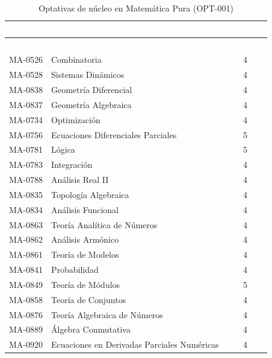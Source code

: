 \begingroup
\small
{}%
\renewcommand{\arraystretch}{1.2}%
%
\begin{longtable}{|l|>{\raggedright\arraybackslash}p{9.4cm}|c|}
\caption{Optativas de núcleo en Matemática Pura (OPT-001)}\label{res:opt001}\\
\hline
\rowcolor{Azul-UCR}
\textcolor{white}{\textbf{Sigla}} & \textcolor{white}{\textbf{Nombre del curso}} & \textcolor{white}{\textbf{Créditos}} \\ \hline
\endfirsthead
\hline
\rowcolor{Azul-UCR}
\textcolor{white}{\textbf{Sigla}} & \textcolor{white}{\textbf{Nombre del curso}} & \textcolor{white}{\textbf{Créditos}} \\ \hline
\endhead
\hline
\endfoot
MA-0526 & Combinatoria & 4 \\ \hline
MA-0528 & Sistemas Dinámicos & 4 \\ \hline
MA-0838 & Geometría Diferencial & 4 \\ \hline
MA-0837 & Geometría Algebraica & 4 \\ \hline
MA-0734 & Optimización & 4 \\ \hline
MA-0756 & Ecuaciones Diferenciales Parciales & 5 \\ \hline
MA-0781 & Lógica & 5 \\ \hline
MA-0783 & Integración & 4 \\ \hline
MA-0788 & Análisis Real II & 4 \\ \hline
MA-0835 & Topología Algebraica & 4 \\ \hline
MA-0834 & Análisis Funcional & 4 \\ \hline
MA-0863 & Teoría Analítica de Números & 4 \\ \hline
MA-0862 & Análisis Armónico & 4 \\ \hline
MA-0861 & Teoría de Modelos & 4 \\ \hline
MA-0841 & Probabilidad & 4 \\ \hline
MA-0849 & Teoría de Módulos & 5 \\ \hline
MA-0858 & Teoría de Conjuntos & 4 \\ \hline
MA-0876 & Teoría Algebraica de Números & 4 \\ \hline
MA-0889 & Álgebra Conmutativa & 4 \\ \hline
MA-0920 & Ecuaciones en Derivadas Parciales Numéricas & 4 \\ \hline
\end{longtable}
\endgroup

